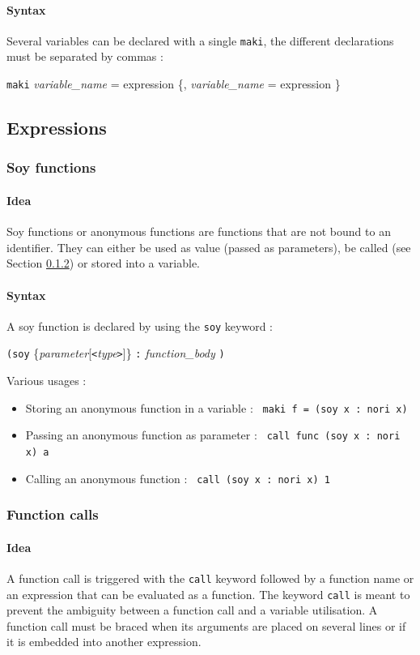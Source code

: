 \documentclass[a4paper,11pt]{article}
\begin{document}
\paragraph{Syntax} Several variables can be declared with a single \texttt{maki}, the different declarations must be separated by commas :
\begin{center}
\texttt{maki} \textit{variable\_name} = expression \{, \textit{variable\_name} = expression \}
\end{center}
\subsection{Expressions}
\subsubsection{Soy functions}
\paragraph{Idea} Soy functions or anonymous functions are functions that are not bound to an identifier. They can either be used as value (passed as parameters), be called (see Section \ref{sssec:func_call}) or stored into a variable.
\paragraph{Syntax} A soy function is declared by using the \texttt{soy} keyword :
\begin{center}
	\texttt{(soy} \{\textit{parameter}[\texttt{<}\textit{type}\texttt{>}]\} \texttt{:} \textit{function\_body} \texttt{)}
\end{center}
Various usages :
\begin{itemize}
	\item Storing an anonymous function in a variable : \texttt{ maki f = (soy x : nori x) }
	\item Passing an anonymous function as parameter : \texttt{ call func (soy x : nori x) a }
	\item Calling an anonymous function : \texttt{ call (soy x : nori x) 1 }
\end{itemize}
\label{sssec:soy_func}
\subsubsection{Function calls}
\label{sssec:func_call}
\paragraph{Idea} A function call is triggered with the \texttt{call} keyword followed by a function name or an expression that can be evaluated as a function.  The keyword \texttt{call} is meant to prevent the ambiguity between a function call and a variable utilisation. A function call must be braced when its arguments are placed on several lines or if it is embedded into another expression.
\end{document}

